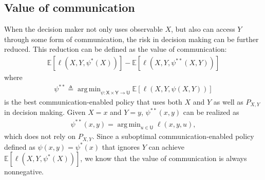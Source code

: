 \documentclass{article}
\newcommand{\E}{\mathbb{E}}
\DeclareMathOperator*{\argmin}{arg\,min}
\def\sU{{\mathsf U}}
\def\sX{{\mathsf X}}
\def\sY{{\mathsf Y}}
\def\deq{\triangleq}
\begin{document}
\subsection{ Value of communication}
When the decision maker not only uses observable $X$, but also can access $Y$ through some form of communication, the risk in decision making can be further reduced. This reduction can be defined as the value of communication:
\begin{align}\label{eq:vopcomu_def}
 \E[\ell(X,Y,\psi^*(X))] - \E[\ell(X,Y,\psi^{**}(X,Y))]
	\end{align}
where
\begin{align}\label{eq:psi**_def}
\psi^{**}\deq\argmin_{\psi:\sX\times\sY\rightarrow\sU} \E[\ell(X, Y,\psi(X,Y))]
\end{align}
is the best communication-enabled policy that uses both $X$ and $Y$ as well as $P_{X,Y}$ in decision making. 
Given $X=x$ and $Y=y$, $\psi^{**}(x,y)$ can be realized as 
\begin{align}
\psi^{**}(x,y) = \argmin_{u\in\sU}\ell(x,y,u) ,
\end{align}
which does not rely on $P_{X,Y}$.
Since a suboptimal communication-enabled policy defined as $\psi(x,y) = \psi^*(x)$ that ignores $Y$ can achieve $\E[\ell(X,Y,\psi^*(X))]$, we know that the value of communication is always nonnegative.
\end{document}
